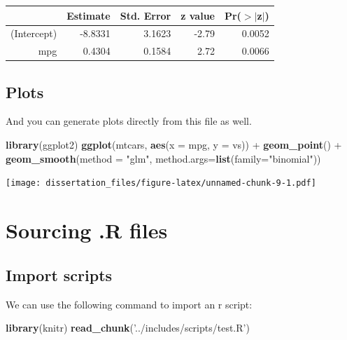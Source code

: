 \documentclass[11pt,report]{uncdissertation}
\newenvironment{Shaded}{\begin{snugshade}}{\end{snugshade}}
\newcommand{\KeywordTok}[1]{\textcolor[rgb]{0.13,0.29,0.53}{\textbf{{#1}}}}
\newcommand{\DataTypeTok}[1]{\textcolor[rgb]{0.13,0.29,0.53}{{#1}}}
\newcommand{\StringTok}[1]{\textcolor[rgb]{0.31,0.60,0.02}{{#1}}}
\newcommand{\NormalTok}[1]{{#1}}
\begin{document}
\begin{table}[ht]
\centering
\begin{tabular}{rrrrr}
  \hline
 & Estimate & Std. Error & z value & Pr($>$$|$z$|$) \\ 
  \hline
(Intercept) & -8.8331 & 3.1623 & -2.79 & 0.0052 \\ 
  mpg & 0.4304 & 0.1584 & 2.72 & 0.0066 \\ 
   \hline
\end{tabular}
\end{table}

\section{Plots}\label{plots}

And you can generate plots directly from this file as well.

\begin{Shaded}
\begin{Highlighting}[]
\KeywordTok{library}\NormalTok{(ggplot2)}
\KeywordTok{ggplot}\NormalTok{(mtcars, }\KeywordTok{aes}\NormalTok{(}\DataTypeTok{x =} \NormalTok{mpg, }\DataTypeTok{y =} \NormalTok{vs)) +}\StringTok{ }
\KeywordTok{geom_point}\NormalTok{() +}\StringTok{ }
\KeywordTok{geom_smooth}\NormalTok{(}\DataTypeTok{method =} \StringTok{"glm"}\NormalTok{, }\DataTypeTok{method.args=}\KeywordTok{list}\NormalTok{(}\DataTypeTok{family=}\StringTok{"binomial"}\NormalTok{))}
\end{Highlighting}
\end{Shaded}

\texttt{[image: dissertation\_files/figure-latex/unnamed-chunk-9-1.pdf]}

\chapter{Sourcing .R files\label{conclusion}}

\section{Import scripts}\label{import-scripts}

We can use the following command to import an r script:

\begin{Shaded}
\begin{Highlighting}[]
\KeywordTok{library}\NormalTok{(knitr)}
\KeywordTok{read_chunk}\NormalTok{(}\StringTok{'../includes/scripts/test.R'}\NormalTok{)}
\end{Highlighting}
\end{Shaded}
\end{document}
